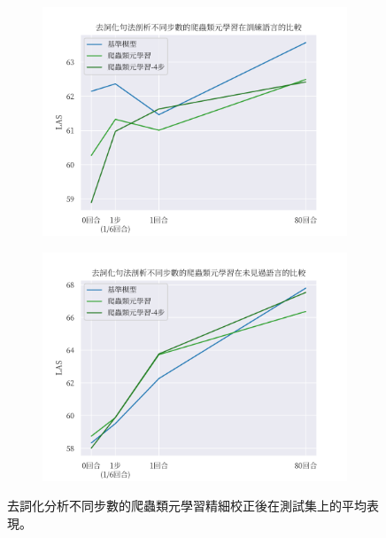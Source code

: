 \begin{figure}[!htbp]
    \centering
    \begin{subfigure}[b]{0.8\textwidth}
        \centering
        \includegraphics[width=\textwidth]{figs/chapter3/delex/delex_reptile_train_langs.pdf}
    \end{subfigure}
    \vspace{-12pt}
    \begin{subfigure}[b]{0.8\textwidth}
        \centering
        \includegraphics[width=\textwidth]{figs/chapter3/delex/delex_reptile_test_langs.pdf}
    \end{subfigure}
    \caption{去詞化分析不同步數的爬蟲類元學習精細校正後在測試集上的平均表現。}
    \label{fig:delex_avg}
\end{figure}